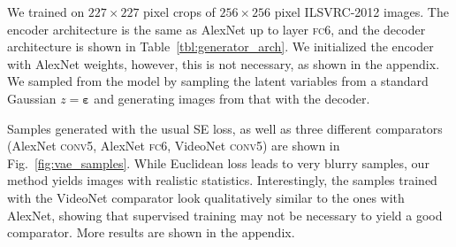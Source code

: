 \documentclass{article}
\newcommand{\conv}{\textsc{conv}}
\newcommand{\fc}{\textsc{fc}}
\newcommand{\ltwo}{SE }
\newcommand{\vaenoise}{\mathbf{\varepsilon}}
\begin{document}
We trained on $227 \times 227$ pixel crops of $256 \times 256$ pixel ILSVRC-2012 images.
The encoder architecture is the same as AlexNet up to layer \fc6, and the decoder architecture is shown in Table~\ref{tbl:generator_arch}.
We initialized the encoder with AlexNet weights, however, this is not necessary, as shown in the appendix.
We sampled from the model by sampling the latent variables from a standard Gaussian $z = \vaenoise$ and generating images from that with the decoder.

Samples generated with the usual \ltwo loss, as well as three different comparators (AlexNet \conv5, AlexNet \fc6, VideoNet \conv5) are shown in Fig.~\ref{fig:vae_samples}.
While Euclidean loss leads to very blurry samples, our method yields images with realistic statistics.
Interestingly, the samples trained with the VideoNet comparator look qualitatively similar to the ones with AlexNet, showing that supervised training may not be necessary to yield a good comparator.
More results are shown in the appendix.
\end{document}
